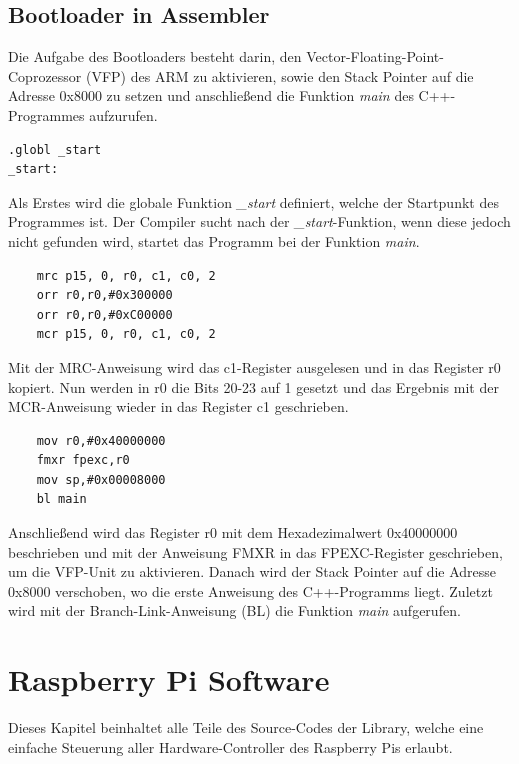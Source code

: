 \documentclass[12pt]{article}
\begin{document}
\subsection{Bootloader in Assembler}
Die Aufgabe des Bootloaders besteht darin, den Vector-Floating-Point-Coprozessor (VFP) des ARM zu aktivieren, sowie den Stack Pointer auf die Adresse 0x8000 zu setzen und anschließend die Funktion \textit{main} des C++-Programmes aufzurufen. \\
\begin{verbatim}
.globl _start
_start:
\end{verbatim}
Als Erstes wird die globale Funktion \textit{\_start} definiert, welche der Startpunkt des Programmes ist. Der Compiler sucht nach der \textit{\_start}-Funktion, wenn diese jedoch nicht gefunden wird, startet das Programm bei der Funktion \textit{main}.\\
\begin{verbatim}
    mrc p15, 0, r0, c1, c0, 2
    orr r0,r0,#0x300000
    orr r0,r0,#0xC00000
    mcr p15, 0, r0, c1, c0, 2
\end{verbatim}
\vspace{-2mm}
Mit der MRC-Anweisung wird das c1-Register ausgelesen und in das Register r0 kopiert. Nun werden in r0 die Bits 20-23 auf 1 gesetzt und das Ergebnis mit der MCR-Anweisung wieder in das Register c1 geschrieben.\\
\begin{verbatim}
    mov r0,#0x40000000
    fmxr fpexc,r0
    mov sp,#0x00008000
    bl main
\end{verbatim}
\vspace{-2mm}
Anschließend wird das Register r0 mit dem Hexadezimalwert 0x40000000 beschrieben und mit der Anweisung FMXR in das FPEXC-Register geschrieben, um die VFP-Unit zu aktivieren. Danach wird der Stack Pointer auf die Adresse 0x8000 verschoben, wo die erste Anweisung des C++-Programms liegt. Zuletzt wird mit der Branch-Link-Anweisung (BL) die Funktion \textit{main} aufgerufen.
\newpage\section{Raspberry Pi Software}
Dieses Kapitel beinhaltet alle Teile des Source-Codes der Library, welche eine einfache Steuerung aller Hardware-Controller des Raspberry Pis erlaubt.
\end{document}
